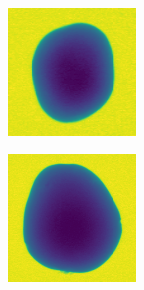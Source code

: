 \documentclass[11pt]{article}
\begin{document}
\begin{figure}[!h]
\begin{subfigure}[b]{0.22\textwidth}
         \caption{}
         \label{fig:perfect_39}
     \end{subfigure}
               \\
    \begin{subfigure}[b]{0.22\textwidth}
         \centering
         \includegraphics[width=\textwidth]{figurer/potato_dataset/perfect/perfect_40.jpg}
         \caption{}
         \label{fig:perfect_40}
     \end{subfigure}
     \hfill
     \begin{subfigure}[b]{0.22\textwidth}
         \centering
         \includegraphics[width=\textwidth]{figurer/potato_dataset/perfect/perfect_41.jpg}

\end{subfigure}
\end{figure}
\end{document}

